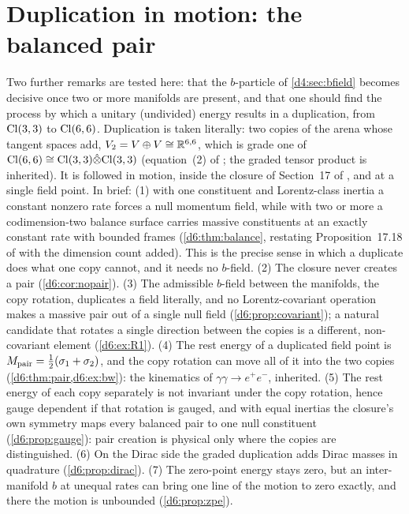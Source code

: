 \section{Duplication in motion: the balanced pair}
\label{d6:sec:main}

Two further remarks are tested here: that the $b$-particle of \cref{d4:sec:bfield} becomes decisive once two or more manifolds are
present, and that one should find the process by which a unitary (undivided) energy results in a duplication, from $\mathrm{Cl}(3,3)$ to
$\mathrm{Cl}(6,6)$. Duplication is taken literally: two copies of the arena whose tangent spaces add, $V_2=V\oplus V\cong\mathbb{R}^{6,6}$, which is grade
one of $\mathrm{Cl}(6,6)\cong\mathrm{Cl}(3,3)\hat\otimes\mathrm{Cl}(3,3)$ (equation~(2) of \cite{ES17}; the graded tensor product is inherited). It is followed in
motion, inside the closure of Section~17 of \cite{ES17}, and at a single field point. In brief:
(1) with one constituent and Lorentz-class inertia a constant nonzero rate forces a null momentum field, while with two or more a
codimension-two balance surface carries massive constituents at an exactly constant rate with bounded frames (\cref{d6:thm:balance},
restating Proposition~17.18 of \cite{ES17} with the dimension count added). This is the precise sense in which a duplicate does what one copy
cannot, and it needs no $b$-field. (2) The closure never creates a pair (\cref{d6:cor:nopair}). (3) The admissible $b$-field between the
manifolds, the copy rotation, duplicates a field literally, and no Lorentz-covariant operation makes a massive pair out of a single null
field (\cref{d6:prop:covariant}); a natural candidate that rotates a single direction between the copies is a different, non-covariant
element (\cref{d6:ex:R1}).
(4) The rest energy of a duplicated field point is $M_{\rm pair}=\tfrac12(\sigma_1+\sigma_2)$, and the copy rotation can move all of it into the two
copies (\cref{d6:thm:pair,d6:ex:bw}): the kinematics of $\gamma\gamma\to e^+e^-$, inherited. (5) The rest energy of each copy separately is
not invariant under the copy rotation, hence gauge dependent if that rotation is gauged, and with equal inertias the closure's own symmetry maps every balanced pair to one null constituent
(\cref{d6:prop:gauge}): pair creation is physical only where the copies are distinguished. (6) On the Dirac side the graded duplication adds
Dirac masses in quadrature (\cref{d6:prop:dirac}). (7) The zero-point energy stays zero, but an inter-manifold $b$ at unequal rates can
bring one line of the motion to zero exactly, and there the motion is unbounded (\cref{d6:prop:zpe}).


